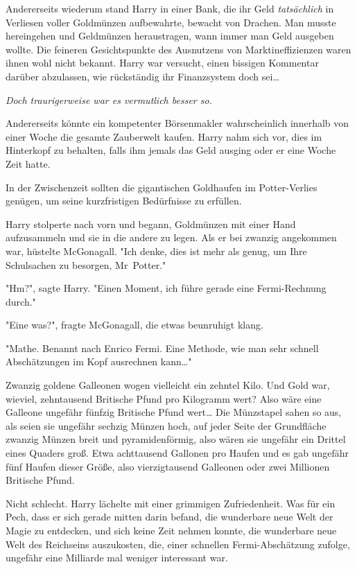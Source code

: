 {Andererseits wiederum stand Harry in einer Bank, die ihr Geld \emph{tatsächlich} in Verliesen voller Goldmünzen aufbewahrte, bewacht von Drachen. Man musste hereingehen und Geldmünzen heraustragen, wann immer man Geld ausgeben wollte. Die feineren Gesichtspunkte des Ausnutzens von Marktineffizienzen waren ihnen wohl nicht bekannt. Harry war versucht, einen bissigen Kommentar darüber abzulassen, wie rückständig ihr Finanzsystem doch sei…

\emph{Doch traurigerweise war es vermutlich besser so.}

Andererseits könnte ein kompetenter Börsenmakler wahrscheinlich innerhalb von einer Woche die gesamte Zauberwelt kaufen. Harry nahm sich vor, dies im Hinterkopf zu behalten, falls ihm jemals das Geld ausging oder er eine Woche Zeit hatte.

In der Zwischenzeit sollten die gigantischen Goldhaufen im Potter-Verlies genügen, um seine kurzfristigen Bedürfnisse zu erfüllen.

Harry stolperte nach vorn und begann, Goldmünzen mit einer Hand aufzusammeln und sie in die andere zu legen. Als er bei zwanzig angekommen war, hüstelte McGonagall. "Ich denke, dies ist mehr als genug, um Ihre Schulsachen zu besorgen, Mr~Potter."

"Hm?", sagte Harry. "Einen Moment, ich führe gerade eine Fermi-Rechnung durch."

"Eine was?", fragte McGonagall, die etwas beunruhigt klang.

"Mathe. Benannt nach Enrico Fermi. Eine Methode, wie man sehr schnell Abschätzungen im Kopf ausrechnen kann…"

Zwanzig goldene Galleonen wogen vielleicht ein zehntel Kilo. Und Gold war, wieviel, zehntausend Britische Pfund pro Kilogramm wert? Also wäre eine Galleone ungefähr fünfzig Britische Pfund wert… Die Münzstapel sahen so aus, als seien sie ungefähr sechzig Münzen hoch, auf jeder Seite der Grundfläche zwanzig Münzen breit und pyramidenförmig, also wären sie ungefähr ein Drittel eines Quaders groß. Etwa achttausend Gallonen pro Haufen und es gab ungefähr fünf Haufen dieser Größe, also vierzigtausend Galleonen oder zwei Millionen Britische Pfund.

Nicht schlecht. Harry lächelte mit einer grimmigen Zufriedenheit. Was für ein Pech, dass er sich gerade mitten darin befand, die wunderbare neue Welt der Magie zu entdecken, und sich keine Zeit nehmen konnte, die wunderbare neue Welt des Reichseins auszukosten, die, einer schnellen Fermi-Abschätzung zufolge, ungefähr eine Milliarde mal weniger interessant war.

}
